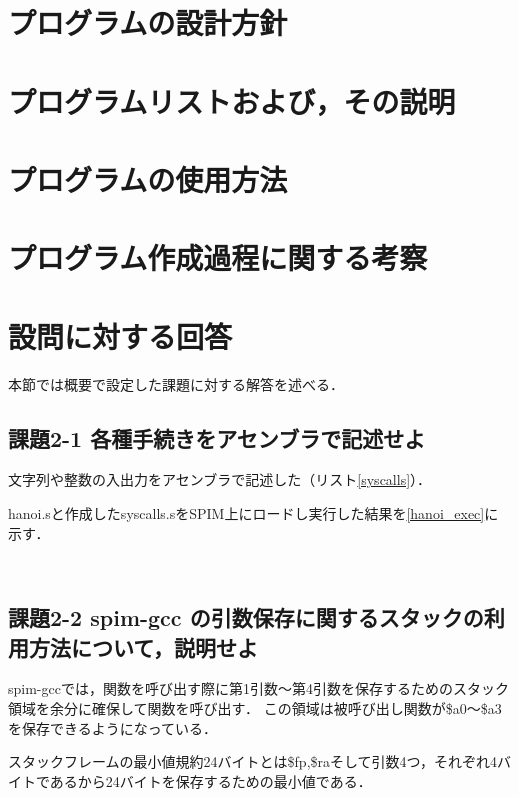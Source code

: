 \documentclass[11pt]{jarticle}
\begin{document}
\section{プログラムの設計方針}

\section{プログラムリストおよび，その説明}

\section{プログラムの使用方法}

\section{プログラム作成過程に関する考察}

\section{設問に対する回答}

本節では概要で設定した課題に対する解答を述べる．

\subsection{課題2-1 各種手続きをアセンブラで記述せよ}

文字列や整数の入出力をアセンブラで記述した（リスト\ref{syscalls}）．

hanoi.sと作成したsyscalls.sをSPIM上にロードし実行した結果を\ref{hanoi_exec}に示す．

\begin{lstlisting}[caption=実行結果,label=hanoi_exec]
  
\end{lstlisting}

\subsection{課題2-2 spim-gcc の引数保存に関するスタックの利用方法について，説明せよ}

spim-gccでは，関数を呼び出す際に第1引数～第4引数を保存するためのスタック領域を余分に確保して関数を呼び出す．
この領域は被呼び出し関数が\$a0～\$a3を保存できるようになっている．

スタックフレームの最小値規約24バイトとは\$fp,\$raそして引数4つ，それぞれ4バイトであるから24バイトを保存するための最小値である．
\end{document}
